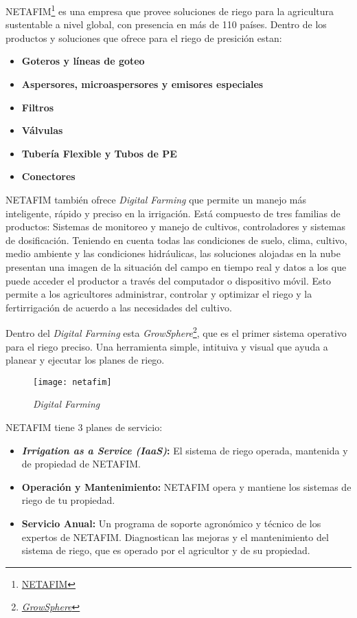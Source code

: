 NETAFIM\footnote{\href{https://www.netafim.com/en/}{NETAFIM}} es una empresa que provee soluciones de riego para la agricultura sustentable a nivel global, con presencia en más de 110 países.
Dentro de los productos y soluciones que ofrece para el riego de presición estan:
\begin{itemize}
    \item \textbf{Goteros y líneas de goteo} 
    \item \textbf{Aspersores, microaspersores y emisores especiales}
    \item \textbf{Filtros}
    \item \textbf{Válvulas}
    \item \textbf{Tubería Flexible y Tubos de PE}
    \item \textbf{Conectores}        
\end{itemize}
NETAFIM también ofrece \textit{Digital Farming} que permite un manejo más inteligente, rápido y preciso en la irrigación. Está compuesto de tres familias de productos: Sistemas de monitoreo y manejo de cultivos, controladores y sistemas de dosificación.
Teniendo en cuenta todas las condiciones de suelo, clima, cultivo, medio ambiente y las condiciones hidráulicas, las soluciones alojadas en la nube presentan una imagen de la situación del campo en tiempo real y datos a los que puede acceder el productor a través del computador o dispositivo móvil. Esto permite a los agricultores administrar, controlar y optimizar el riego y la fertirrigación de acuerdo a las necesidades del cultivo.

Dentro del \textit{Digital Farming} esta \textit{GrowSphere}\footnote{\href{https://www.netafim.com/en/digital-farming/}{\textit{GrowSphere}}}, que es el primer sistema operativo para el riego preciso. Una herramienta simple, intituiva y visual que ayuda a planear y ejecutar los planes de riego.
\begin{figure}[h]
	\centering
	\texttt{[image: netafim]}
	\caption{\label{fig:netafim} \textit{Digital Farming}}
\end{figure}

NETAFIM tiene 3 planes de servicio:
\begin{itemize}
    \item \textbf{\textit{Irrigation as a Service (IaaS)}:} El sistema de riego operada, mantenida y de propiedad de NETAFIM. 
    \item \textbf{Operación y Mantenimiento:} NETAFIM opera y mantiene los sistemas de riego de tu propiedad.
    \item \textbf{Servicio Anual:} Un programa de soporte agronómico y técnico de los expertos de NETAFIM. Diagnostican las mejoras y el mantenimiento del sistema de riego, que es operado por el agricultor y de su propiedad.
\end{itemize}

